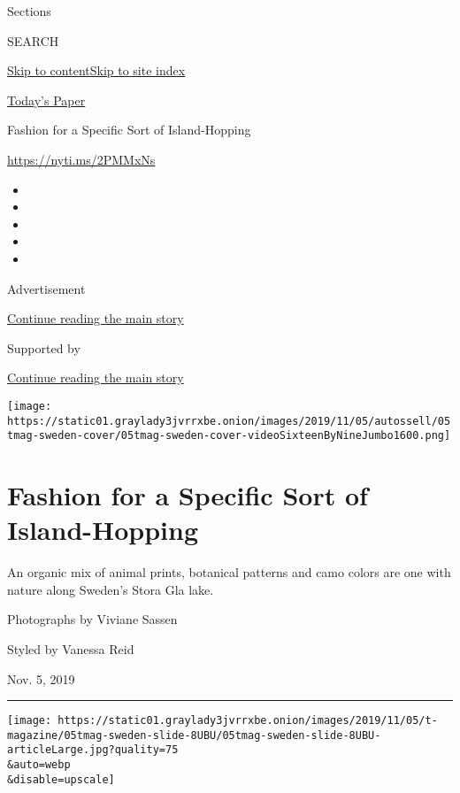 Sections

SEARCH

\protect\hyperlink{site-content}{Skip to
content}\protect\hyperlink{site-index}{Skip to site index}

\href{https://myaccount.nytimes3xbfgragh.onion/auth/login?response_type=cookie\&client_id=vi}{}

\href{https://www.nytimes3xbfgragh.onion/section/todayspaper}{Today's
Paper}

Fashion for a Specific Sort of Island-Hopping

\url{https://nyti.ms/2PMMxNs}

\begin{itemize}
\item
\item
\item
\item
\item
\end{itemize}

Advertisement

\protect\hyperlink{after-top}{Continue reading the main story}

Supported by

\protect\hyperlink{after-sponsor}{Continue reading the main story}

\texttt{[image: https://static01.graylady3jvrrxbe.onion/images/2019/11/05/autossell/05tmag-sweden-cover/05tmag-sweden-cover-videoSixteenByNineJumbo1600.png]}

\hypertarget{fashion-for-a-specific-sort-of-island-hopping}{%
\section{Fashion for a Specific Sort of
Island-Hopping}\label{fashion-for-a-specific-sort-of-island-hopping}}

An organic mix of animal prints, botanical patterns and camo colors are
one with nature along Sweden's Stora Gla lake.

Photographs by Viviane Sassen

Styled by Vanessa Reid

Nov. 5, 2019

\begin{center}\rule{0.5\linewidth}{\linethickness}\end{center}

\texttt{[image: https://static01.graylady3jvrrxbe.onion/images/2019/11/05/t-magazine/05tmag-sweden-slide-8UBU/05tmag-sweden-slide-8UBU-articleLarge.jpg?quality=75\\\&auto=webp\\\&disable=upscale]}


